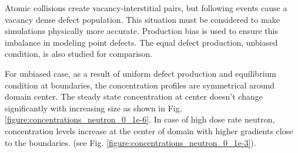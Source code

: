 \documentclass[a4paper]{article}
\begin{document}
    Atomic collisions create vacancy-interstitial pairs, but following events cause a vacancy dense defect population. This situation must be considered to make simulations physically more accurate. Production bias is used to ensure this imbalance in modeling point defects. The equal defect production, unbiased condition, is also studied for comparison.

    For unbiased case, as a result of uniform defect production and equilibrium condition at boundaries, the concentration profiles are symmetrical around domain center. The steady state concentration at center doesn't change significantly with increasing size as shown in Fig. \ref{figure:concentrations_neutron_0_1e-6}. In case of high dose rate neutron, concentration levels increase at the center of domain with higher gradients close to the boundaries. (see Fig. \ref{figure:concentrations_neutron_0_1e-3}).\\
\end{document}
